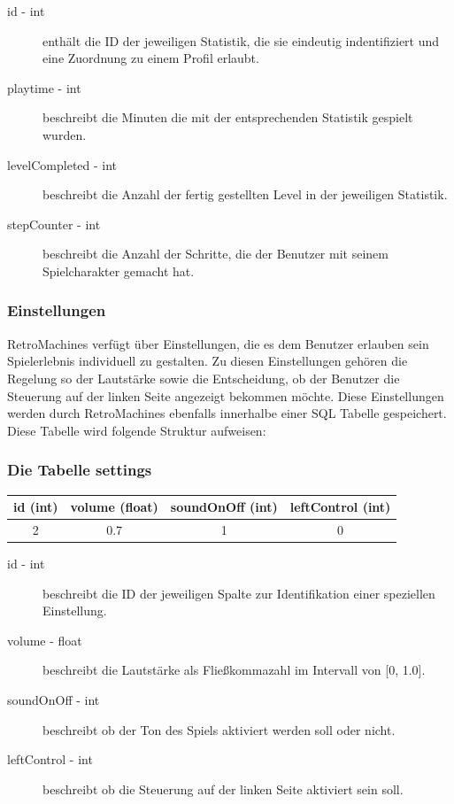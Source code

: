 \documentclass[11pt,a4paper]{report}
\begin{document}
\begin{description}
	\item[id - int] enthält die ID der jeweiligen Statistik, die sie eindeutig indentifiziert und eine Zuordnung zu einem Profil erlaubt.
	\item[playtime - int] beschreibt die Minuten die mit der entsprechenden Statistik gespielt wurden.
	\item[levelCompleted - int] beschreibt die Anzahl der fertig gestellten Level in der jeweiligen Statistik.
	\item[stepCounter - int] beschreibt die Anzahl der Schritte, die der Benutzer mit seinem Spielcharakter gemacht hat.
\end{description}

\subsubsection{Einstellungen}

RetroMachines verfügt über Einstellungen, die es dem Benutzer erlauben sein Spielerlebnis individuell zu gestalten. Zu diesen Einstellungen gehören die Regelung so der Lautstärke sowie die Entscheidung, ob der Benutzer die Steuerung auf der linken Seite angezeigt bekommen möchte. Diese Einstellungen werden durch RetroMachines ebenfalls innerhalbe einer SQL Tabelle gespeichert. Diese Tabelle wird folgende Struktur aufweisen:

{\center
\subsubsection*{Die Tabelle settings}
\begin{tabular}{cccc}
	\hline
	id (int) & volume (float) & soundOnOff (int) & leftControl (int) \\
	\hline
	2 & 0.7 & 1 & 0 \\
	\hline
\end{tabular}
\par
}

\begin{description}
	\item[id - int] beschreibt die ID der jeweiligen Spalte zur Identifikation einer speziellen Einstellung.
	\item[volume - float] beschreibt die Lautstärke als Fließkommazahl im Intervall von [0, 1.0].
	\item[soundOnOff - int] beschreibt ob der Ton des Spiels aktiviert werden soll oder nicht.
	\item[leftControl - int] beschreibt ob die Steuerung auf der linken Seite aktiviert sein soll.
\end{description}
\end{document}
